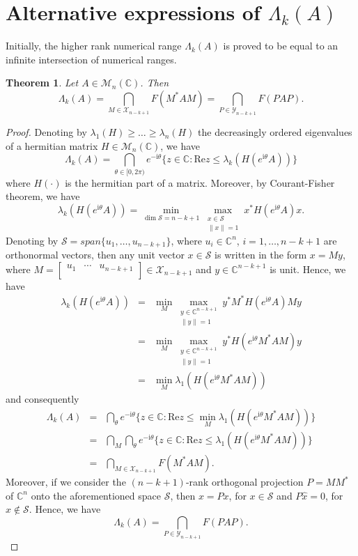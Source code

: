 \documentclass[12pt, reqno]{amsart}
\newtheorem{theorem}{Theorem}[section]
\theoremstyle{definition}
\theoremstyle{remark}
\numberwithin{equation}{section}
\begin{document}
\section{Alternative expressions of $\Lambda_{k}(A)$}\label{sec:1}
Initially, the higher rank numerical range $\Lambda_{k}(A)$  is proved to be equal to an infinite intersection of numerical ranges.
\begin{theorem}\label{th1}
Let $A\in\mathcal{M}_{n}(\mathbb{C})$. Then
\[
\Lambda_{k}(A)=\bigcap_{M\in\mathcal{X}_{n-k+1}}{F(M^{*}AM)}=\bigcap_{P\in\mathcal{Y}_{n-k+1}}{F(PAP)}.
\]
\end{theorem}
\begin{proof}
Denoting by $\lambda_{1}(H)\geq \ldots \geq \lambda_{n}(H)$ the decreasingly ordered eigenvalues of a hermitian
matrix $H\in\mathcal{M}_{n}(\mathbb{C})$, we have \cite{Li-Sze}
\[
\Lambda_{k}(A)=\bigcap_{\theta\in[0, 2\pi)}{e^{-\mathrm{i}\theta}\{z\in\mathbb{C} : \mathrm{Re} z \leq \lambda_{k}(H(e^{\mathrm{i}\theta}A))\}}
\]
where $H(\cdot)$ is the hermitian part of a matrix. Moreover, by Courant-Fisher theorem, we have
\[
\lambda_{k}(H(e^{\mathrm{i}\theta}A))=\min_{\dim \mathcal{S}=n-k+1}{\max_{\substack{x\in \mathcal{S}\\ \|x\|=1}}{x^{*}H(e^{\mathrm{i}\theta}A)x}}.
\]
Denoting by $\mathcal{S}=span\{u_{1}, \ldots, u_{n-k+1}\}$, where $u_{i}\in\mathbb{C}^{n}$, $i=1, \ldots, n-k+1$ are orthonormal vectors,
then any unit vector $x\in\mathcal{S}$ is written in the form $x=My$, where
$M=\begin{bmatrix} u_{1} & \cdots & u_{n-k+1} \\ \end{bmatrix}\in\mathcal{X}_{n-k+1}$ and $y\in\mathbb{C}^{n-k+1}$ is unit.
Hence, we have
\begin{eqnarray*}
 
 \lambda_{k}(H(e^{\mathrm{i}\theta}A)) & = & \min_{M}{\max_{\substack{y\in \mathbb{C}^{n-k+1}\\ \|y\|=1}}{y^{*}M^{*}H(e^{\mathrm{i}\theta}A)My}}\\
    & = & \min_{M}{\max_{\substack{y\in \mathbb{C}^{n-k+1}\\ \|y\|=1}}{y^{*}H(e^{\mathrm{i}\theta}M^{*}AM)y}} \\
    & = & \min_{M}{\lambda_{1}(H(e^{\mathrm{i}\theta}M^{*}AM))}
\end{eqnarray*}
and consequently
\begin{eqnarray*}
\Lambda_{k}(A) & = & \bigcap_{\theta}{e^{-\mathrm{i}\theta}\{z\in\mathbb{C} : \mathrm{Re}z \leq \min_{M}{\lambda_{1}(H(e^{\mathrm{i}\theta}M^{*}AM))}\}}\\
               & = & \bigcap_{M}{\bigcap_{\theta}{e^{-\mathrm{i}\theta}\{z\in\mathbb{C} : \mathrm{Re}z \leq \lambda_{1}(H(e^{\mathrm{i}\theta}M^{*}AM))\}}}\\
               & = & \bigcap_{M\in\mathcal{X}_{n-k+1}}{F(M^{*}AM)}.
\end{eqnarray*}
Moreover, if we consider the $(n-k+1)$-rank orthogonal projection $P=MM^{*}$ of $\mathbb{C}^{n}$ onto the aforementioned space $\mathcal{S}$, then $x=Px$, for $x\in\mathcal{S}$ and $P\hat{x}=0$, for $\hat{x}\notin\mathcal{S}$. Hence, we have
\[
\Lambda_{k}(A)=\bigcap_{P\in\mathcal{Y}_{n-k+1}}{F(PAP)}.
\]
\end{proof}
\end{document}
